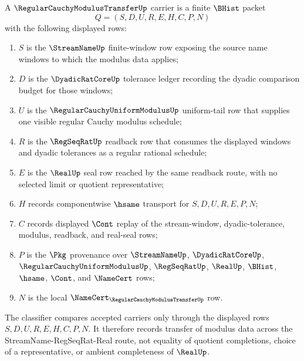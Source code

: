 \begin{definition}
\label{def:regular-cauchy-modulus-transfer-carrier}
A $\RegularCauchyModulusTransferUp$ carrier is a finite $\BHist$ packet
$$
Q=(S,D,U,R,E,H,C,P,N)
$$
with the following displayed rows:
\begin{enumerate}
\item $S$ is the $\StreamNameUp$ finite-window row exposing the source name windows to which the modulus data applies;
\item $D$ is the $\DyadicRatCoreUp$ tolerance ledger recording the dyadic comparison budget for those windows;
\item $U$ is the $\RegularCauchyUniformModulusUp$ uniform-tail row that supplies one visible regular Cauchy modulus schedule;
\item $R$ is the $\RegSeqRatUp$ readback row that consumes the displayed windows and dyadic tolerances as a regular rational schedule;
\item $E$ is the $\RealUp$ seal row reached by the same readback route, with no selected limit or quotient representative;
\item $H$ records componentwise $\hsame$ transport for $S,D,U,R,E,P,N$;
\item $C$ records displayed $\Cont$ replay of the stream-window, dyadic-tolerance, modulus, readback, and real-seal rows;
\item $P$ is the $\Pkg$ provenance over $\StreamNameUp$, $\DyadicRatCoreUp$, $\RegularCauchyUniformModulusUp$, $\RegSeqRatUp$, $\RealUp$, $\BHist$, $\hsame$, $\Cont$, and $\NameCert$ rows;
\item $N$ is the local $\NameCert_{\RegularCauchyModulusTransferUp}$ row.
\end{enumerate}
The classifier compares accepted carriers only through the displayed rows $S,D,U,R,E,H,C,P,N$. It therefore records transfer of modulus data across the StreamName-RegSeqRat-Real route, not equality of quotient completions, choice of a representative, or ambient completeness of $\RealUp$.
\end{definition}

